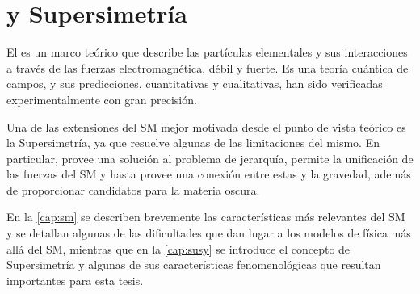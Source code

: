 \chapter{{\SM} y Supersimetría}
\label{cap:teoria}


El {\SM} es un marco teórico que describe
las partículas elementales y sus interacciones a través de las fuerzas
electromagnética, débil y fuerte. Es una teoría cuántica de campos, y
sus predicciones, cuantitativas y cualitativas, han sido verificadas
experimentalmente con gran precisión.

Una de las extensiones del SM mejor motivada desde el punto de vista teórico es
la Supersimetría, ya que resuelve algunas de las limitaciones del
mismo. En particular, provee una solución al problema de jerarquía, permite la
unificación de las fuerzas del SM y hasta provee una conexión entre estas y la
gravedad, además de proporcionar candidatos para la materia oscura.

En la \cref{cap:sm} se describen brevemente las características más relevantes
del SM y se detallan algunas de las dificultades que dan lugar a los modelos de
física más allá del SM, mientras que en la \cref{cap:susy} se introduce el
concepto de Supersimetría y algunas de sus características fenomenológicas que
resultan importantes para esta tesis.




